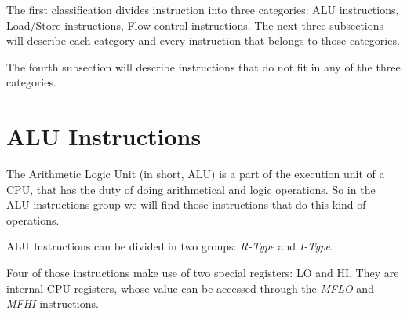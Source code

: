 \documentclass[letterpaper,10pt,english]{sphinxmanual}
\begin{document}
The first classification divides instruction into three categories:
ALU instructions, Load/Store instructions, Flow control instructions. The next
three subsections will describe each category and every instruction that belongs
to those categories.

The fourth subsection will describe instructions that do not fit in any of the
three categories.


\section{ALU Instructions}
\label{instructions:alu-instructions}
The Arithmetic Logic Unit (in short, ALU) is a part of the execution unit of a
CPU, that has the duty of doing arithmetical and logic operations. So in the ALU
instructions group we will find those instructions that do this kind of
operations.

ALU Instructions can be divided in two groups: \emph{R-Type} and \emph{I-Type}.

Four of those instructions make use of two special registers: LO and HI. They
are internal CPU registers, whose value can be accessed through the
\emph{MFLO} and \emph{MFHI} instructions.
\end{document}
